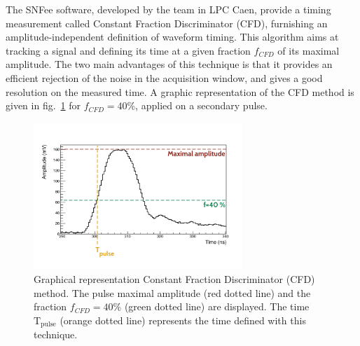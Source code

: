 The SNFee software, developed by the team in LPC Caen, provide a timing measurement called Constant Fraction Discriminator (CFD), furnishing an amplitude-independent definition of waveform timing.
This algorithm aims at tracking a signal and defining its time at a given fraction $f_{CFD}$ of its maximal amplitude.
The two main advantages of this technique is that it provides an efficient rejection of the noise in the acquisition window, and gives a good resolution on the measured time.
A graphic representation of the CFD method is given in fig.~\ref{fig:CFD} for $f_{CFD}=40$\%, applied on a secondary pulse.
\begin{figure}[h!]
  \centering
  \includegraphics[trim={1.2cm 1.5cm 1.7cm 3.1cm},clip,width=0.7\textwidth]{commissioning/fig_commissioning/CFD_example_zoom.pdf}
  \caption{Graphical representation Constant Fraction Discriminator (CFD) method.
    The pulse maximal amplitude (red dotted line) and the fraction $f_{CFD}=40\%$ (green dotted line) are displayed.
    The time $\text{T}_{\text{pulse}}$ (orange dotted line) represents the time defined with this technique.
    \label{fig:CFD}}
\end{figure}

